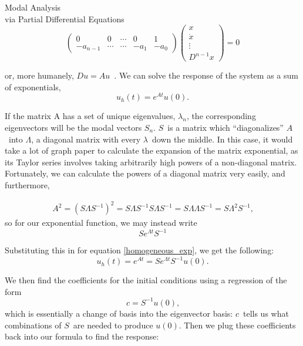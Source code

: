 \documentclass[a4paper,10pt]{report}
\numberwithin{equation}{section}
\begin{document}
{\begin{chapter}
\begin{section}{Modal Analysis \\via Partial Differential Equations}
\begin{equation}
\begin{pmatrix}
0 &0 &\cdots &0 &1\\
-a_{n-1} &\cdots &\cdots &-a_1 &-a_0
\end{pmatrix}
\begin{pmatrix}
      x\\
      \dot{x}\\
      \vdots\\
      D^{n-1}x
     \end{pmatrix}
= 0
\end{equation}
\par
or, more humanely, $Du = Au$\  . We can solve the response of the system as a sum of exponentials,
\begin{equation}
u_h(t) = e^{At}u(0) \text{.}
\end{equation}
\par
If the matrix A has a set of unique eigenvalues, $\lambda_n$, the corresponding eigenvectors will be the modal vectors $S_n$. $S$\  is a matrix which ``diagonalizes'' $A$\  into $\Lambda$, a diagonal matrix with every $\lambda$\  down the middle. In this case, it would take a lot of graph paper to calculate the expansion of the matrix exponential, as its Taylor series involves taking arbitrarily high powers of a non-diagonal matrix. Fortunately, we can calculate the powers of a diagonal matrix very easily, and furthermore,\cite[p.~20]{Reid1992}
\par
\begin{align*}
A^2 = (S \Lambda S^{-1})^2
= S \Lambda S^{-1} S \Lambda S^{-1}
= S \Lambda \Lambda S^{-1}
= S \Lambda^2 S^{-1} \text{,}
\end{align*}
so for our exponential function, we may instead write
\begin{equation}
S e^{\Lambda t} S^{-1}
\end{equation}
\par
Substituting this in for equation \eqref{homogeneous_exp}, we get the following:
\begin{equation}
u_h(t) = e^{At} = Se^{\Lambda t} S^{-1} u(0) \text{.}
\end{equation}
\par
We then find the coefficients for the initial conditions using a regression of the form
\begin{equation}
 c = S^{-1} u(0) \text{,} 
\end{equation}
which is essentially a change of basis into the eigenvector basis: $c$\  tells us what combinations of $S$\  are needed to produce $u(0)$. Then we plug these coefficients back into our formula to find the response:

\end{section}
\end{chapter}}
\end{document}

